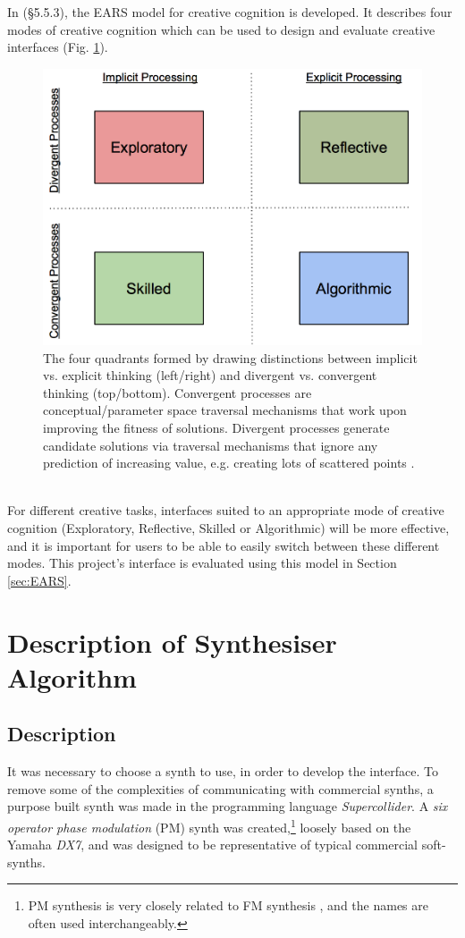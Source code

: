 \documentclass[11pt, oneside]{report}   	%
\begin{document}
In \cite{TubbThesis}(\S 5.5.3), the EARS model for creative cognition is developed. It describes four modes of creative cognition which can be used to design and evaluate creative interfaces (Fig. \ref{fig:EARSmodel}).
\begin{figure}[h] 
	\centering
	\includegraphics[width = 5in]{EARSmodel.png}
	\caption{The four quadrants formed by drawing distinctions between implicit vs. explicit thinking (left/right) and divergent vs. convergent thinking (top/bottom). Convergent processes are conceptual/parameter space traversal mechanisms that work upon improving the fitness of solutions. Divergent processes generate candidate solutions via traversal mechanisms that ignore any prediction of increasing value, e.g. creating lots of scattered points \cite{TubbThesis}.}
	\label{fig:EARSmodel}
\end{figure}\\
For different creative tasks, interfaces suited to an appropriate mode of creative cognition (Exploratory, Reflective, Skilled or Algorithmic) will be more effective, and it is important for users to be able to easily switch between these different modes. This project's interface is evaluated using this model in Section \ref{sec:EARS}.


\chapter{Description of Synthesiser Algorithm}
\section{Description}
 It was necessary to choose a synth to use, in order to develop the interface. To remove some of the complexities of communicating with commercial synths, a purpose built synth was made in the programming language \emph{Supercollider}.
A \emph{six operator phase modulation} (PM) synth was created,\footnote{PM synthesis is very closely related to FM synthesis \cite{FM}, and the names are often used interchangeably.} loosely based on the Yamaha \emph{DX7}, and was designed to be representative of typical commercial soft-synths.
 
\end{document}

